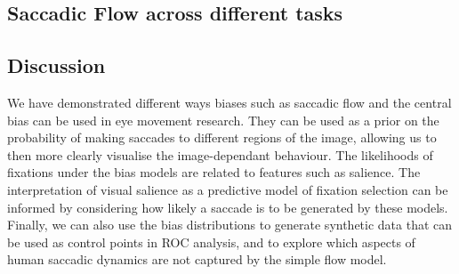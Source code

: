 \subsection{Saccadic Flow across different tasks}


\subsection{Discussion}

We have demonstrated different ways biases such as saccadic flow and the central bias can be used in eye movement research. They can be used as a prior on the probability of making saccades to different regions of the image, allowing us to then more clearly visualise the image-dependant behaviour. The likelihoods of fixations under the bias models are related to features such as salience. The interpretation of visual salience as a predictive model of fixation selection can be informed by considering how likely a saccade is to be generated by these models. Finally, we can also use the bias distributions to generate synthetic data that can be used as control points in ROC analysis, and to explore which aspects of human saccadic dynamics are not captured by the simple flow model. 
